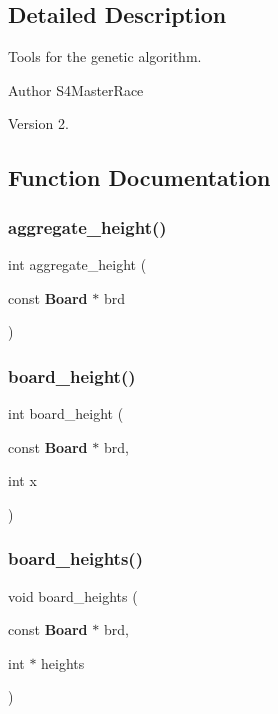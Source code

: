 \subsection{Detailed Description}
Tools for the genetic algorithm. 

\begin{DoxyAuthor}{Author}
S4\+Master\+Race 
\end{DoxyAuthor}
\begin{DoxyVersion}{Version}
2. 
\end{DoxyVersion}


\subsection{Function Documentation}
\mbox{\label{tools_8c_ad841ef8c1553fc39aedf9ff99c4338c8}} 
\subsubsection{aggregate\+\_\+height()}
{\footnotesize\ttfamily int aggregate\+\_\+height (\begin{DoxyParamCaption}\item[{const \textbf{ Board} $\ast$}]{brd }\end{DoxyParamCaption})}

\mbox{\label{tools_8c_a91ae5afacda12393e4a93ca8c298832c}} 
\subsubsection{board\+\_\+height()}
{\footnotesize\ttfamily int board\+\_\+height (\begin{DoxyParamCaption}\item[{const \textbf{ Board} $\ast$}]{brd,  }\item[{int}]{x }\end{DoxyParamCaption})}

\mbox{\label{tools_8c_a0074ffa2b0873ffccfdbc813ccf02ba0}} 
\subsubsection{board\+\_\+heights()}
{\footnotesize\ttfamily void board\+\_\+heights (\begin{DoxyParamCaption}\item[{const \textbf{ Board} $\ast$}]{brd,  }\item[{int $\ast$}]{heights }\end{DoxyParamCaption})}

